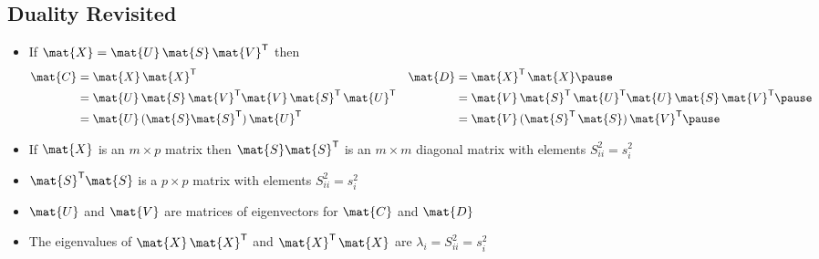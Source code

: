 \begin{slide}
\section[-2]{Duality Revisited}

\begin{PauseHighLight}
  \begin{itemize}
  \item If $\mat{X} = \mat{U}\,\mat{S}\,\mat{V}^\tr$ then
    \begin{align*}
      \mat{C} &= \mat{X}\, \mat{X}^\tr & \mat{D}  &= \mat{X}^\tr\, \mat{X}\pause\\
      &= \mat{U}\,\mat{S}\,\mat{V}^\tr\mat{V}\,\mat{S}^\tr\,\mat{U}^\tr &
      &=
        \mat{V}\,\mat{S}^\tr\,\mat{U}^\tr\mat{U}\,\mat{S}\,\mat{V}^\tr\pause\\
      &= \mat{U}\,(\mat{S}\mat{S}^\tr)\,\mat{U}^\tr  &
      &=
        \mat{V}\,(\mat{S}^\tr\,\mat{S})\,\mat{V}^\tr\pause                        
    \end{align*}
  \item If $\mat{X}$ is an $m\times p$ matrix then $\mat{S}\mat{S}^\tr$
    is an $m\times m$ diagonal matrix with elements $S_{ii}^2=s_i^2$\pause
  \item $\mat{S}^\tr\mat{S}$  is a $p\times p$ matrix  with elements
    $S_{ii}^2=s_i^2$\pause
  \item $\mat{U}$ and $\mat{V}$ are matrices of eigenvectors for
    $\mat{C}$ and $\mat{D}$\pause
  \item The eigenvalues of $\mat{X}\, \mat{X}^\tr$ and $\mat{X}^\tr\,
    \mat{X}$ are $\lambda_i = S_{ii}^2 = s_i^2$\pause 
  \end{itemize}
\end{PauseHighLight}

\end{slide}


